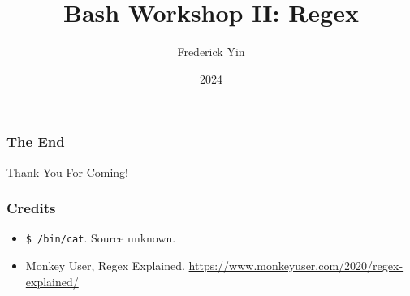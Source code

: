 \documentclass{beamer}
\title{Bash Workshop II: Regex}
\author{Frederick Yin}
\institute{JITech}
\date{2024}
\renewcommand{\tt}{\texttt}
\begin{document}
\frame{\titlepage}



\begin{frame}
\frametitle{The End}
\vspace{1cm}
\centering \Huge {Thank You For Coming!}
\end{frame}

\begin{frame}
\frametitle{Credits}
\begin{itemize}
    \item \tt{\$ /bin/cat}. Source unknown.
    \item Monkey User, Regex Explained.
        \url{https://www.monkeyuser.com/2020/regex-explained/}
\end{itemize}
\end{frame}
\end{document}

